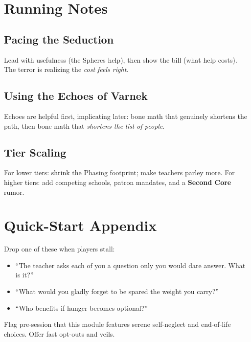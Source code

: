 \documentclass[11pt,twoside]{book}
\newcommand{\Mechanic}[2]{%
  \begin{mechanicbox}[frametitle={#1}]
    #2
  \end{mechanicbox}
}
\begin{document}
\chapter{Running Notes}

\section*{Pacing the Seduction}
Lead with usefulness (the Spheres help), then show the bill (what help costs). The terror is realizing the \emph{cost feels right}.

\section*{Using the Echoes of Varnek}
Echoes are helpful first, implicating later: bone math that genuinely shortens the path, then bone math that \emph{shortens the list of people}.

\section*{Tier Scaling}
For lower tiers: shrink the Phasing footprint; make teachers parley more. For higher tiers: add competing schools, patron mandates, and a \textbf{Second Core} rumor.

\chapter{Quick-Start Appendix}

\Mechanic{Checkpoint Prompts}{
Drop one of these when players stall:
\begin{itemize}[leftmargin=*]
  \item ``The teacher asks each of you a question only you would dare answer. What is it?''
  \item ``What would you gladly forget to be spared the weight you carry?''
  \item ``Who benefits if hunger becomes optional?''
\end{itemize}
}

\Mechanic{Table Safety}{
Flag pre-session that this module features serene self-neglect and end-of-life choices. Offer fast opt-outs and veils.
}
\end{document}
